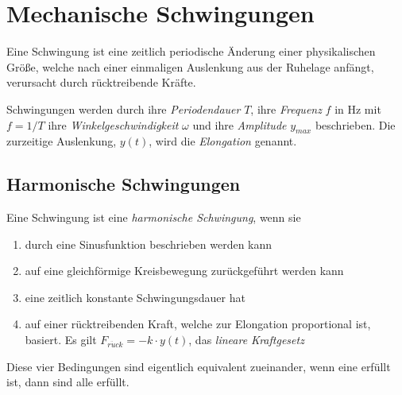 \documentclass{article}
\begin{document}
\section{Mechanische Schwingungen}
Eine Schwingung ist eine zeitlich periodische Änderung einer physikalischen Größe, welche nach einer einmaligen Auslenkung aus der Ruhelage anfängt, verursacht durch rücktreibende Kräfte.
 
Schwingungen werden durch ihre \emph{Periodendauer} $T$, ihre \emph{Frequenz} $f$ in $\text{Hz}$ mit $f=1/T$ ihre \emph{Winkelgeschwindigkeit} $\omega$ und ihre \emph{Amplitude} $y_{max}$ beschrieben. Die zurzeitige Auslenkung, $y(t)$, wird die \emph{Elongation} genannt.
\begin{center}
\end{center} 
 
\subsection{Harmonische Schwingungen} 
Eine Schwingung ist eine \emph{harmonische Schwingung}, wenn sie
\begin{enumerate}
 \item durch eine Sinusfunktion beschrieben werden kann
 \item auf eine gleichförmige Kreisbewegung zurückgeführt werden kann
 \item eine zeitlich konstante Schwingungsdauer hat 
 \item auf einer rücktreibenden Kraft, welche zur Elongation proportional ist, basiert. Es gilt $F_{r\ddot{u}ck} = -k \cdot y(t)$, das \emph{lineare Kraftgesetz}
\end{enumerate} 
Diese vier Bedingungen sind eigentlich equivalent zueinander, wenn eine erfüllt ist, dann sind alle erfüllt.
 
\end{document}
